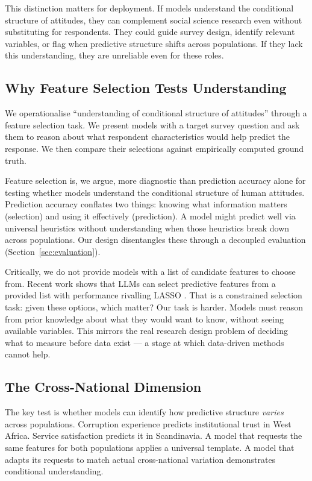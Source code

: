 \documentclass[11pt]{article}
\begin{document}
This distinction matters for deployment. If models understand the conditional structure of attitudes, they can complement social science research even without substituting for respondents. They could guide survey design, identify relevant variables, or flag when predictive structure shifts across populations. If they lack this understanding, they are unreliable even for these roles.

\subsection{Why Feature Selection Tests Understanding}

We operationalise ``understanding of conditional structure of attitudes'' through a feature selection task. We present models with a target survey question and ask them to reason about what respondent characteristics would help predict the response. We then compare their selections against empirically computed ground truth.

Feature selection is, we argue, more diagnostic than prediction accuracy alone for testing whether models understand the conditional structure of human attitudes. Prediction accuracy conflates two things: knowing what information matters (selection) and using it effectively (prediction). A model might predict well via universal heuristics without understanding when those heuristics break down across populations. Our design disentangles these through a decoupled evaluation (Section~\ref{sec:evaluation}).

Critically, we do not provide models with a list of candidate features to choose from. Recent work shows that LLMs can select predictive features from a provided list with performance rivalling LASSO \citep{jeong2024llmselect}. That is a constrained selection task: given these options, which matter? Our task is harder. Models must reason from prior knowledge about what they would want to know, without seeing available variables. This mirrors the real research design problem of deciding what to measure before data exist — a stage at which data-driven methods cannot help.

\subsection{The Cross-National Dimension}

The key test is whether models can identify how predictive structure \textit{varies} across populations. Corruption experience predicts institutional trust in West Africa. Service satisfaction predicts it in Scandinavia. A model that requests the same features for both populations applies a universal template. A model that adapts its requests to match actual cross-national variation demonstrates conditional understanding.
\end{document}
